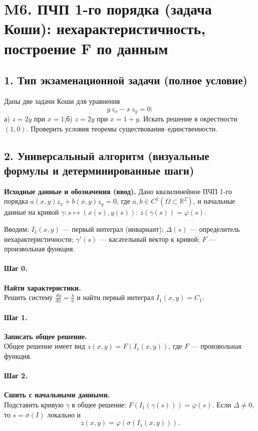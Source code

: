 \section{M6. ПЧП 1-го порядка (задача Коши): нехарактеристичность, построение F по данным}

\subsection*{1. Тип экзаменационной задачи (полное условие)}
Даны две задачи Коши для уравнения
\[
y\,z_x-x\,z_y=0:
\]
а) \(z=2y\) при \(x=1\);\quad б) \(z=2y\) при \(x=1+y\).
Искать решение в окрестности \((1,0)\). Проверить условия теоремы существования–единственности.

\subsection*{2. Универсальный алгоритм (визуальные формулы и детерминированные шаги)}

\textbf{Исходные данные и обозначения (ввод).} Дано квазилинейное ПЧП 1-го порядка \(a(x,y)z_x+b(x,y)z_y=0\), где \(a,b\in C^1(\Omega\subset\mathbb R^2)\), и начальные данные на кривой \(\gamma:s\mapsto(x(s),y(s))\): \(z(\gamma(s))=\varphi(s)\).

Вводим: \(I_1(x,y)\) — первый интеграл (инвариант); \(\Delta(s)\) — определитель нехарактеристичности; \(\gamma'(s)\) — касательный вектор к кривой; \(F\) — произвольная функция.

\paragraph{Шаг 0.} \textbf{Найти характеристики.}\\
Решить систему \(\displaystyle \frac{dy}{dx}=\frac{b}{a}\) и найти первый интеграл \(I_1(x,y)=C_1\).

\paragraph{Шаг 1.} \textbf{Записать общее решение.}\\
Общее решение имеет вид \(z(x,y)=F(I_1(x,y))\), где \(F\) — произвольная функция.

\paragraph{Шаг 2.} \textbf{Сшить с начальными данными.}\\
Подставить кривую \(\gamma\) в общее решение: \(F(I_1(\gamma(s)))=\varphi(s)\).
Если \(\Delta\neq0\), то \(s=\sigma(I)\) локально и
\[
z(x,y)=\varphi(\sigma(I_1(x,y))).
\]

